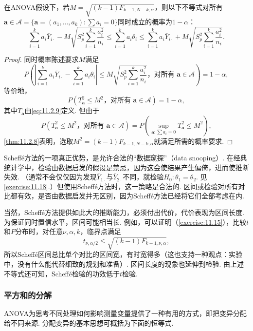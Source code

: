 \begin{theorem}\label{thm:11.2.10}
在ANOVA假设下，若$M=\sqrt{(k-1)F_{k-1,N-k,\alpha}}$，则以下不等式对所有$\boldsymbol a\in\mathcal A=\{\boldsymbol a=(a_1,\ldots,a_k):\sum a_i=0\}$同时成立的概率为$1-\alpha$：
$$\sum_{i=1}^ka_i\bar Y_{i\cdot}-M\sqrt{S_p^2\sum_{i=1}^k\frac{a_i^2}{n_i}}
\le\sum_{i=1}^ka_i\theta_i
\le\sum_{i=1}^ka_i\bar Y_{i\cdot}+M\sqrt{S_p^2\sum_{i=1}^k\frac{a_i^2}{n_i}}.$$
\end{theorem}
\begin{proof}
同时概率陈述要求$M$满足
$$P\left(\left|\sum_{i=1}^ka_i\bar Y_{i\cdot}-\sum_{i=1}^ka_i\theta_i\right|
\le M\sqrt{S_p^2\sum_{i=1}^k\frac{a_i^2}{n_i}}\text{，对所有 }\boldsymbol a\in\mathcal A\right)=1-\alpha,$$
等价地，
$$P(T_{\boldsymbol a}^2\le M^2\text{，对所有 }\boldsymbol a\in\mathcal A)=1-\alpha,$$
其中$T_{\boldsymbol a}$由\eqref{eq:11.2.9}定义. 但由于
$$P(T_{\boldsymbol a}^2\le M^2\text{，对所有 }\boldsymbol a\in\mathcal A)
=P\left(\sup_{\boldsymbol a:\sum a_i=0}T_{\boldsymbol a}^2\le M^2\right),$$
\autoref{thm:11.2.8}表明，选取$M^2=(k-1)F_{k-1,N-k,\alpha}$就满足所需的概率要求.
\end{proof}

Scheff\'e方法的一项真正优势，是允许合法的“数据窥探”（data snooping）. 在经典统计学中，检验由数据启发的假设是禁忌，因为这会使结果产生偏倚，进而使推断失效. （通常不会仅仅因为发现$\bar Y_{1\cdot}$与$\bar Y_{2\cdot}$不同，就检验$H_0:\theta_1=\theta_2$. 见\autoref{exercise:11.18}.）但使用Scheff\'e方法时，这一策略是合法的. 区间或检验对所有对比都有效，是否由数据启发并无区别，因为Scheff\'e方法已经将它们全部考虑在内.

当然，Scheff\'e方法提供如此大的推断能力，必须付出代价，代价表现为区间长度. 为保证同时置信水平，区间可能相当长. 例如，可以证明（\autoref{exercise:11.15}），比较$t$和$F$分布时，对任意$\nu,\alpha,k$，临界点满足
$$t_{\nu,\alpha/2}\le\sqrt{(k-1)F_{k-1,\nu,\alpha}},$$
所以Scheff\'e区间总比单个对比的区间宽，有时宽得多（这也支持一种观点：实验中，没有什么能代替细致的规划和准备）. 区间长度的现象也延伸到检验. 由上述不等式还可知，Scheff\'e检验的功效低于$t$检验.

\subsubsection{平方和的分解}\label{sec:11.2.6}
ANOVA为思考不同处理如何影响测量变量提供了一种有用的方式，即把变异分配给不同来源. 分配变异的基本思想可概括为下面的恒等式.

